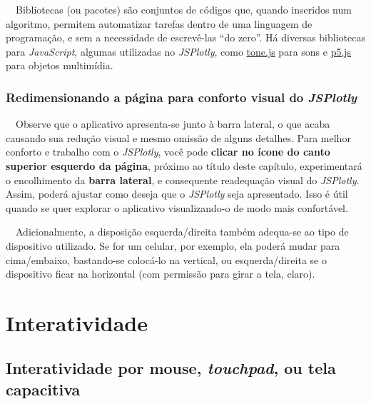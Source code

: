 \documentclass[
  portuguese,
  letterpaper,
  DIV=11,
  numbers=noendperiod]{scrreprt}
\begin{document}
~~Bibliotecas (ou pacotes) são conjuntos de códigos que, quando
inseridos num algoritmo, permitem automatizar tarefas dentro de uma
linguagem de programação, e sem a necessidade de escrevê-las ``do
zero''. Há diversas bibliotecas para \emph{JavaScript}, algumas
utilizadas no \emph{JSPlotly}, como
\href{https://tonejs.github.io/}{tone.js} para sons e
\href{https://p5js.org/}{p5.js} para objetos multimídia.

\hfill\break

\subsection{\texorpdfstring{Redimensionando a página para conforto
visual do
\emph{JSPlotly}}{Redimensionando a página para conforto visual do JSPlotly}}\label{redimensionando-a-puxe1gina-para-conforto-visual-do-jsplotly}

~~Observe que o aplicativo apresenta-se junto à barra lateral, o que
acaba causando sua redução visual e mesmo omissão de alguns detalhes.
Para melhor conforto e trabalho com o \emph{JSPlotly}, você pode
\textbf{{clicar no ícone do canto superior esquerdo da página}}, próximo
ao título deste capítulo, experimentará o encolhimento da \textbf{barra
lateral}, e consequente readequação visual do \emph{JSPlotly}. Assim,
poderá ajustar como deseja que o \emph{JSPlotly} seja apresentado. Isso
é útil quando se quer explorar o aplicativo visualizando-o de modo mais
confortável.

~~Adicionalmente, a disposição esquerda/direita também adequa-se ao tipo
de dispositivo utilizado. Se for um celular, por exemplo, ela poderá
mudar para cima/embaixo, bastando-se colocá-lo na vertical, ou
esquerda/direita se o dispositivo ficar na horizontal (com permissão
para girar a tela, claro).

\hfill\break


\chapter{Interatividade}\label{interatividade}

\section{\texorpdfstring{Interatividade por mouse, \emph{touchpad}, ou
tela
capacitiva}{Interatividade por mouse, touchpad, ou tela capacitiva}}\label{interatividade-por-mouse-touchpad-ou-tela-capacitiva}
\end{document}

